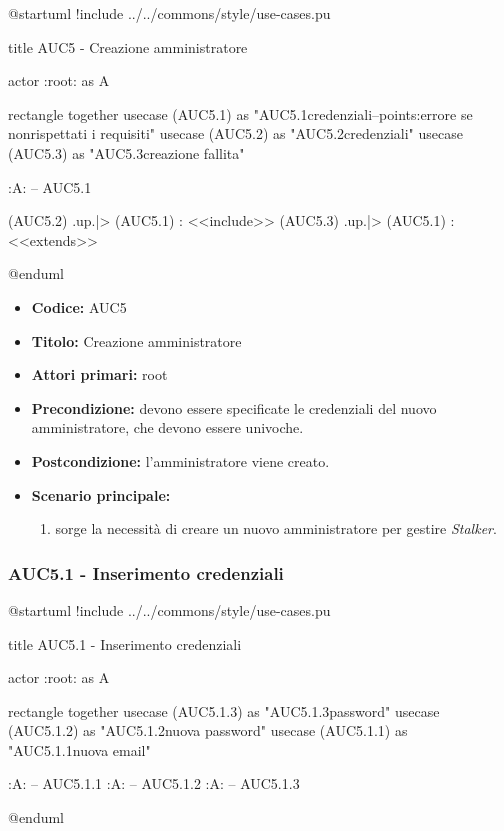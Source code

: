 \documentclass[casi-duso]{subfiles}
\begin{document}
\begin{plantuml}
@startuml
!include ../../commons/style/use-cases.pu

title AUC5 - Creazione amministratore

actor :root: as A

rectangle {
  together {
    usecase (AUC5.1) as "AUC5.1\nInserimento credenziali\n--\nExtension points:\nvisualizzazione errore se non\nvengono rispettati i requisiti"
    usecase (AUC5.2) as "AUC5.2\nVerifica credenziali"
    usecase (AUC5.3) as "AUC5.3\nVisualizza creazione fallita"
  }
}

:A: -- AUC5.1

(AUC5.2) .up.|> (AUC5.1) : <<include>>
(AUC5.3) .up.|> (AUC5.1) : <<extends>>

@enduml
\end{plantuml}

\begin{itemize}
  \item \textbf{Codice:} AUC5
  \item \textbf{Titolo:} Creazione amministratore
  \item \textbf{Attori primari:} root
  \item \textbf{Precondizione:} devono essere specificate le credenziali del nuovo amministratore, che devono essere univoche.
  \item \textbf{Postcondizione:} l'amministratore viene creato.
  \item \textbf{Scenario principale:}
  \begin{enumerate}
    \item sorge la necessità di creare un nuovo amministratore per gestire \emph{Stalker}.
  \end{enumerate}
\end{itemize}


\subsubsection{AUC5.1 - Inserimento credenziali}%
\label{subsub:AUC5.1}

\begin{plantuml}
@startuml
!include ../../commons/style/use-cases.pu

title AUC5.1 - Inserimento credenziali

actor :root: as A

rectangle {
  together {
    usecase (AUC5.1.3) as "AUC5.1.3\nConferma password"
    usecase (AUC5.1.2) as "AUC5.1.2\nInserimento nuova password"
    usecase (AUC5.1.1) as "AUC5.1.1\nInserimento nuova email"
  }
}

:A: -- AUC5.1.1
:A: -- AUC5.1.2
:A: -- AUC5.1.3

@enduml
\end{plantuml}
\end{document}
